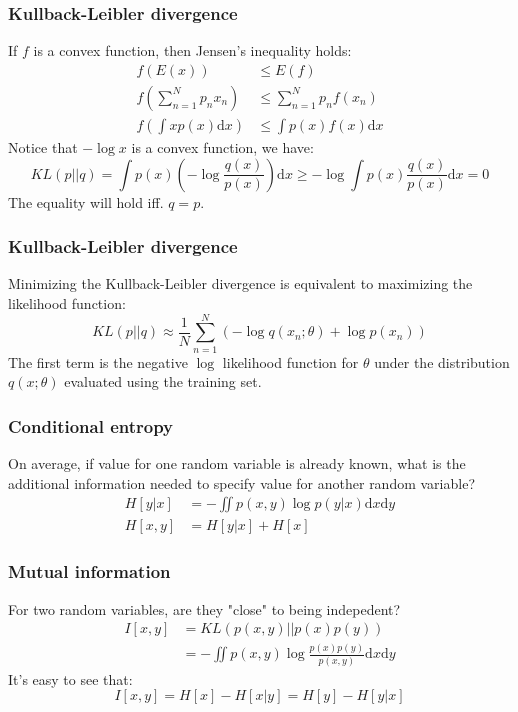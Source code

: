 \documentclass{beamer}
\begin{document}
\begin{frame}
    \frametitle{Kullback-Leibler divergence}
    If $f$ is a convex function, then Jensen's inequality holds:
    \begin{align*}
        f(E(x))&\le{}E(f) \\
        f(\sum_{n=1}^{N}p_{n}x_{n})&\le\sum_{n=1}^{N}p_{n}f(x_{n}) \\
        f(\int{}xp(x)\mathrm{d}x)&\le\int{}p(x)f(x)\mathrm{d}x
    \end{align*}
    Notice that $-\log{}x$ is a convex function, we have:
    \begin{equation*}
        KL(p||q)=\int{}p(x)(-\log\frac{q(x)}{p(x)})\mathrm{d}x\ge-\log\int{}p(x)\frac{q(x)}{p(x)}\mathrm{d}x=0
    \end{equation*}
    The equality will hold iff. $q=p$.
\end{frame}

\begin{frame}
    \frametitle{Kullback-Leibler divergence}
    Minimizing the Kullback-Leibler divergence is equivalent to maximizing the likelihood function:
    \begin{equation*}
        KL(p||q)\approx\frac{1}{N}\sum_{n=1}^{N}(-\log{}q(x_{n};\theta)+\log{}p(x_{n}))
    \end{equation*}
    The first term is the negative $\log$ likelihood function for $\theta$ under the distribution $q(x;\theta)$ evaluated using the training set.
\end{frame}

\begin{frame}
    \frametitle{Conditional entropy}
    On average, if value for one random variable is already known, what is the additional information needed to specify value for another random variable?
    \begin{align*}
        H[y|x]&=-\iint{}p(x,y)\log{}p(y|x)\mathrm{d}x\mathrm{d}y \\
        H[x,y]&=H[y|x]+H[x]
    \end{align*}
\end{frame}

\begin{frame}
    \frametitle{Mutual information}
    For two random variables, are they "close" to being indepedent?
    \begin{align*}
        I[x,y]&=KL(p(x,y)||p(x)p(y)) \\
        &=-\iint{}p(x,y)\log\frac{p(x)p(y)}{p(x,y)}\mathrm{d}x\mathrm{d}y
    \end{align*}
    It's easy to see that:
    \begin{equation*}
        I[x,y]=H[x]-H[x|y]=H[y]-H[y|x]
    \end{equation*}
\end{frame}
\end{document}
